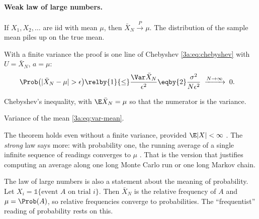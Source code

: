 \paragraph{Weak law of large numbers.}
If $X_1,X_2,\dots$ are iid with mean $\mu$, then
$\bar X_N\xrightarrow{P}\mu$. The distribution of the sample mean piles up
on the true mean.

With a finite variance the proof is one line of Chebyshev
\eqref{3a:eq:chebyshev} with $U=\bar X_N$, $a=\mu$:
\begin{align}
  \Prob\bigl(|\bar X_N-\mu|>\epsilon\bigr)
  &\relby{1}{\le} \frac{\Var\bar X_N}{\epsilon^2}
   \eqby{2} \frac{\sigma^2}{N\epsilon^2}
   \;\xrightarrow{N\to\infty}\;0 .
  \label{3a:eq:wlln}
\end{align}
\begin{explain}
  \item Chebyshev's inequality, with $\E\bar X_N=\mu$ so that the numerator is the variance.
  \item Variance of the mean \eqref{3a:eq:var-mean}.
\end{explain}
The theorem holds even without a finite variance, provided $\E|X|<\infty$
. The \emph{strong} law says more: with probability one,
the running average of a single infinite sequence of readings converges to
$\mu$ . That is the version that justifies computing an
average along one long Monte Carlo run or one long Markov chain.

The law of large numbers is also a statement about the meaning of
probability. Let $X_i=\mathbb{1}\{\text{event }A\text{ on trial }i\}$. Then
$\bar X_N$ is the relative frequency of $A$ and $\mu=\Prob(A)$, so relative
frequencies converge to probabilities. The ``frequentist'' reading of
probability rests on this.

